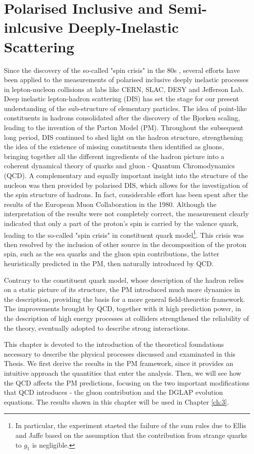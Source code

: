 \chapter{Polarised Inclusive and Semi-inlcusive Deeply-Inelastic Scattering}
\label{ch:2}

Since the discovery of the so-called "spin crisis" in the 80s \cite{Leader_Anselmino}, several efforts have been applied to the measurements of polarised inclusive deeply inelastic processes in lepton-nucleon collisions at labs like CERN, SLAC, DESY and Jefferson Lab. Deep inelastic lepton-hadron scattering (DIS) has set the stage for our present understanding of the sub-structure of elementary particles. The idea of point-like constituents in hadrons consolidated after the discovery of the Bjorken scaling, leading to the invention of the Parton Model (PM). Throughout the subsequent long period, DIS continued to shed light on the hadron structure, strengthening the idea of the existence of missing constituents then identified as gluons, bringing together all the different ingredients of the hadron picture into a coherent dynamical theory of quarks and gluon - Quantum Chromodynamics (QCD). A complementary and equally important insight into the structure of the nucleon was then provided by polarised DIS, which allows for the investigation of the spin structure of hadrons. In fact, considerable effort has been spent after the results of the European Muon Collaboration in the 1980. Although the interpretation of the results were not completely correct, the measurement clearly indicated that only a part of the proton's spin is carried by the valence quark, leading to the so-called "spin crisis" in constituent quark model\footnote{In particular, the experiment staeted the failure of the sum rules due to Ellis and Jaffe based on the assumption that the contribution from strange quarks to $g_1$ is negligible.}. This crisis was then resolved by the inclusion of other source in the decomposition of the proton spin, such as the sea quarks and the gluon spin contributions, the latter heuristically predicted in the PM, then naturally introduced by QCD.\par
Contrary to the constituent quark model, whose description of the hadron relies on a static picture of its structure, the PM introduced much more dynamics in the description, providing the basis for a more general field-theoretic framework. The improvements brought by QCD, together with it high prediction power, in the description of high energy processes at colliders strengthened the reliability of the theory, eventually adopted to describe strong interactions.\par
This chapter is devoted to the introduction of the theoretical foundations necessary to describe the physical processes discussed and examinated in this Thesis. We first derive the results in the PM framework, since it provides an intuitive approach the quantities that enter the analysis. Then, we will see how the QCD affects the PM predictions, focusing on the two important modifications that QCD introduces - the gluon contribution and the DGLAP evolution equations. The results shown in this chapter will be used in Chapter \ref{ch:3}.

